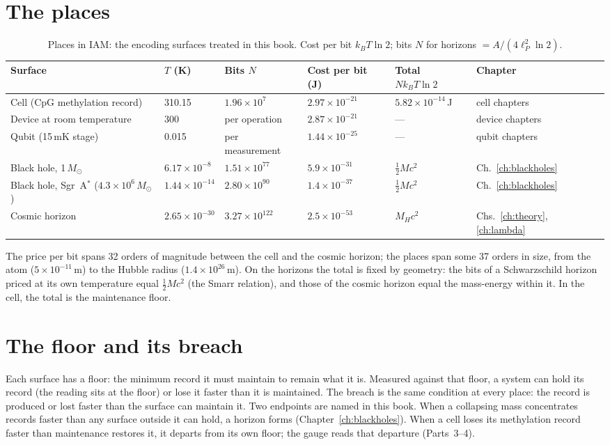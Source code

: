 \section{The places}
\begin{table}[h]\centering\small
\caption{Places in IAM: the encoding surfaces treated in this book. Cost per bit $k_BT\ln2$; bits $N$ for horizons $=A/(4\ell_P^2\ln2)$.}\label{tab:surfaces}
\begin{tabular}{llllll}\toprule
Surface & $T$ (K) & Bits $N$ & Cost per bit (J) & Total $N k_BT\ln2$ & Chapter\\\midrule
Cell (CpG methylation record) & 310.15 & $1.96\times10^{7}$ & $2.97\times10^{-21}$ & $5.82\times10^{-14}$\,J & cell chapters\\
Device at room temperature & 300 & per operation & $2.87\times10^{-21}$ & --- & device chapters\\
Qubit (15\,mK stage) & 0.015 & per measurement & $1.44\times10^{-25}$ & --- & qubit chapters\\
Black hole, 1\,$M_\odot$ & $6.17\times10^{-8}$ & $1.51\times10^{77}$ & $5.9\times10^{-31}$ & $\tfrac12Mc^2$ & Ch.~\ref{ch:blackholes}\\
Black hole, Sgr~A$^*$ ($4.3\times10^6\,M_\odot$) & $1.44\times10^{-14}$ & $2.80\times10^{90}$ & $1.4\times10^{-37}$ & $\tfrac12Mc^2$ & Ch.~\ref{ch:blackholes}\\
Cosmic horizon & $2.65\times10^{-30}$ & $3.27\times10^{122}$ & $2.5\times10^{-53}$ & $M_Hc^2$ & Chs.~\ref{ch:theory}, \ref{ch:lambda}\\\bottomrule
\end{tabular}\end{table}
The price per bit spans 32 orders of magnitude between the cell and the cosmic horizon; the places span some 37 orders in size, from the
atom ($5\times10^{-11}$\,m) to the Hubble radius ($1.4\times10^{26}$\,m). On the horizons the total is fixed by geometry: the bits of a
Schwarzschild horizon priced at its own temperature equal $\tfrac12Mc^2$ (the Smarr relation), and those of the cosmic horizon equal the mass-energy
within it. In the cell, the total is the maintenance floor.

\section{The floor and its breach}
Each surface has a floor: the minimum record it must maintain to remain what it is. Measured against that floor, a system can hold its record
(the reading sits at the floor) or lose it faster than it is maintained. The breach is the same condition at every place: the record is produced
or lost faster than the surface can maintain it. Two endpoints are named in this book. When a collapsing mass concentrates records faster than any
surface outside it can hold, a horizon forms (Chapter~\ref{ch:blackholes}). When a cell loses its methylation record faster than maintenance restores
it, it departs from its own floor; the gauge reads that departure (Parts~3--4).

